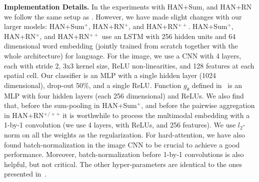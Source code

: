 \noindent\textbf{Implementation Details.}
 In the experiments with HAN+Sum, and HAN+RN we follow the same setup as \cite{santoro2017simple}. However, we have made slight changes with our larger models: HAN+Sum$^{+}$, HAN+RN$^{+}$, and HAN+RN$^{++}$.
  HAN+Sum$^{+}$, HAN+RN$^{+}$, and HAN+RN$^{++}$ use an LSTM with 256 hidden units and 64 dimensional word embedding (jointly trained from scratch together with the whole architecture) for language.  For the image, we use a CNN with 4 layers, each with stride 2, 3x3 kernel size, ReLU non-linearities, and 128 features at each spatial cell.  Our classifier  is an MLP with a single hidden layer (1024 dimensional),  drop-out 50\%, and a single ReLU. Function $g_\theta$ defined in~\cite{santoro2017simple} is an MLP with four hidden layers (each 256 dimensional) and ReLUs. We also find that, before the sum-pooling in HAN+Sum$^{+}$, and before the pairwise aggregation in HAN+RN$^{+/++}$ it is worthwhile to process the multimodal embedding with a 1-by-1 convolution (we use 4 layers, with ReLUs, and 256 features). We use $l_2$-norm on all the weights as the regularization. For hard-attention, we have also found batch-normalization in the image CNN to be crucial to achieve a good performance. Moreover, batch-normalization before 1-by-1 convolutions is also helpful, but not critical. The other hyper-parameters are identical to the ones presented in~\cite{santoro2017simple}.

